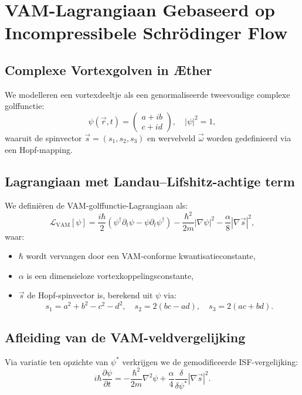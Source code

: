 
\section{VAM-Lagrangiaan Gebaseerd op Incompressibele Schrödinger Flow}

\subsection{Complexe Vortexgolven in Æther}

We modelleren een vortexdeeltje als een genormaliseerde tweevoudige complexe golffunctie:
\[
    \psi(\vec{r}, t) = \begin{pmatrix} a + ib \\ c + id \end{pmatrix}, \quad |\psi|^2 = 1,
\]
waaruit de spinvector $\vec{s} = (s_1, s_2, s_3)$ en wervelveld $\vec{\omega}$ worden gedefinieerd via een Hopf-mapping.

\subsection{Lagrangiaan met Landau–Lifshitz-achtige term}

We definiëren de VAM-golffunctie-Lagrangiaan als:
\begin{equation}
    \mathcal{L}_\text{VAM}[\psi] =
    \frac{i\hbar}{2} \left( \psi^\dagger \partial_t \psi - \psi \partial_t \psi^\dagger \right)
    - \frac{\hbar^2}{2m} |\nabla \psi|^2
    - \frac{\alpha}{8} |\nabla \vec{s}|^2,
\end{equation}
waar:
\begin{itemize}
    \item $\hbar$ wordt vervangen door een VAM-conforme kwantisatieconstante,
    \item $\alpha$ is een dimensieloze vortexkoppelingsconstante,
    \item $\vec{s}$ de Hopf-spinvector is, berekend uit $\psi$ via:
    \[
        s_1 = a^2 + b^2 - c^2 - d^2, \quad
        s_2 = 2(bc - ad), \quad
        s_3 = 2(ac + bd).
    \]
\end{itemize}

\subsection{Afleiding van de VAM-veldvergelijking}

Via variatie ten opzichte van $\psi^*$ verkrijgen we de gemodificeerde ISF-vergelijking:
\[
    i\hbar \frac{\partial \psi}{\partial t} =
    - \frac{\hbar^2}{2m} \nabla^2 \psi
    + \frac{\alpha}{4} \frac{\delta}{\delta \psi^*} |\nabla \vec{s}|^2.
\]

